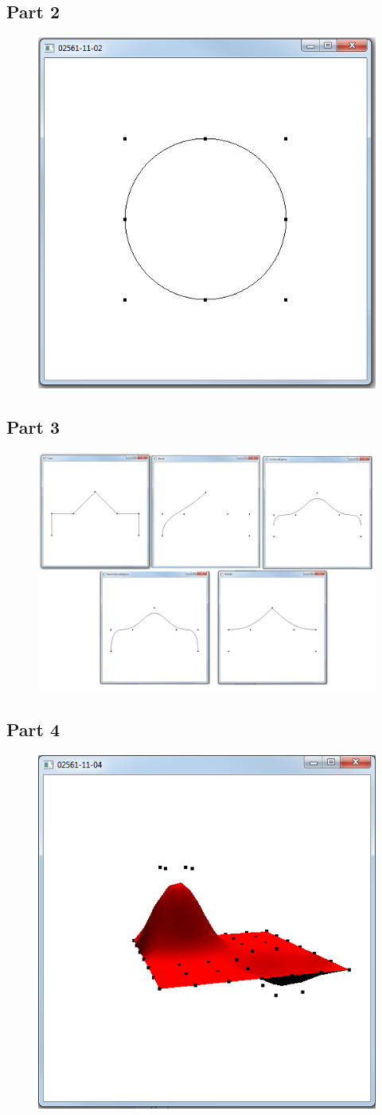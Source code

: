 \documentclass[11pt]{article}
\begin{document}
\subsection{Part 2}
\begin{figure}[H]
	\centering
	\includegraphics[width=0.5\linewidth]{images/e11p2}
	\label{fig:e11p2}
\end{figure}

\subsection{Part 3}
\begin{figure}[H]
	\centering
	\includegraphics[width=0.5\linewidth]{images/e11p3}
	\label{fig:e11p3}
\end{figure}

\subsection{Part 4}
\begin{figure}[H]
	\centering
	\includegraphics[width=0.5\linewidth]{images/e11p4}
	\label{fig:e11p4}
\end{figure}
\end{document}
